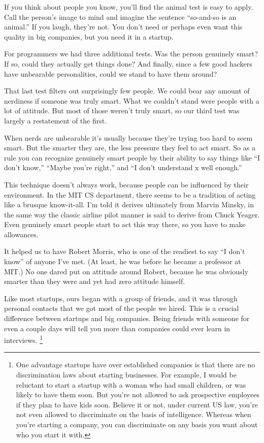 \documentclass[12pt]{book}
\begin{document}
If you think about people you know, you'll find the animal test is easy
to apply. Call the person's image to mind and imagine the sentence
``so-and-so is an animal.'' If you laugh, they're not. You don't need or
perhaps even want this quality in big companies, but you need it in a
startup.

For programmers we had three additional tests. Was the person genuinely
smart? If so, could they actually get things done? And finally, since a
few good hackers have unbearable personalities, could we stand to have
them around?

That last test filters out surprisingly few people. We could bear any
amount of nerdiness if someone was truly smart. What we couldn't stand
were people with a lot of attitude. But most of those weren't truly
smart, so our third test was largely a restatement of the first.

When nerds are unbearable it's usually because they're trying too hard
to seem smart. But the smarter they are, the less pressure they feel to
act smart. So as a rule you can recognize genuinely smart people by
their ability to say things like ``I don't know,'' ``Maybe you're
right,'' and ``I don't understand x well enough.''

This technique doesn't always work, because people can be influenced by
their environment. In the MIT CS department, there seems to be a
tradition of acting like a brusque know-it-all. I'm told it derives
ultimately from Marvin Minsky, in the same way the classic airline pilot
manner is said to derive from Chuck Yeager. Even genuinely smart people
start to act this way there, so you have to make allowances.

It helped us to have Robert Morris, who is one of the readiest to say
``I don't know'' of anyone I've met. (At least, he was before he became
a professor at MIT.) No one dared put on attitude around Robert, because
he was obviously smarter than they were and yet had zero attitude
himself.

Like most startups, ours began with a group of friends, and it was
through personal contacts that we got most of the people we hired. This
is a crucial difference between startups and big companies. Being
friends with someone for even a couple days will tell you more than
companies could ever learn in interviews. \footnote{One advantage startups have over established companies is that
there are no discrimination laws about starting businesses. For example,
I would be reluctant to start a startup with a woman who had small
children, or was likely to have them soon. But you're not allowed to ask
prospective employees if they plan to have kids soon. Believe it or not,
under current US law, you're not even allowed to discriminate on the
basis of intelligence. Whereas when you're starting a company, you can
discriminate on any basis you want about who you start it with.}
\end{document}
